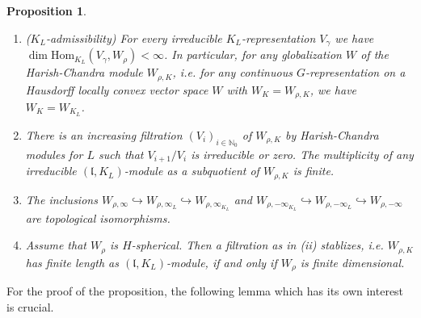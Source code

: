 \documentclass[10]{amsart}
\newtheorem{pro}[thm]{Proposition}
\theoremstyle{remark}
\theoremstyle{definition}
\numberwithin{equation}{section}
\newcommand{\N}{\mathbb{N}}           %
\newcommand{\Hom}{\mathrm{Hom}}
\newcommand{\fl}{{\mathfrak l}}
\begin{document}
{\begin{pro}
\begin{enumerate}
\item[(i)] ($K_L$-admissibility) For every irreducible $K_L$-representation $V_\gamma$ we have $\dim \Hom_{K_L}(V_\gamma,W_\rho)<\infty$. In particular, for any globalization $W$
of  the Harish-Chandra module $W_{\rho,K}$, i.e. for any continuous $G$-representation  on a Hausdorff locally convex vector space $W$ with $W_K=W_{\rho,K}$, we have
$W_{K}=W_{K_L}$.
\item[(ii)] There is an increasing filtration $(V_i)_{i\in\N_0}$  of $W_{\rho,K}$ by Harish-Chandra modules for $L$
such that $V_{i+1}/V_i$ is irreducible or zero. The multiplicity of any irreducible $(\fl,K_L)$-module as a subquotient of $W_{\rho,K}$ is finite.
\item[(iii)] The inclusions $W_{\rho,\infty}\hookrightarrow W_{\rho,\infty_L}\hookrightarrow W_{\rho,\infty_{K_L}}$ and $W_{\rho,-\infty_{K_L}}\hookrightarrow W_{\rho,-\infty_L}\hookrightarrow W_{\rho,-\infty}$ are topological
isomorphisms.
\item[(iv)] Assume that $W_\rho$ is $H$-spherical. Then a filtration as in (ii) stablizes, i.e. $W_{\rho,K}$ has finite length as $(\fl,K_L)$-module, if and only if $W_\rho$ is finite dimensional.
\end{enumerate}
\end{pro}

For the proof of the proposition, the following lemma which has its own interest is crucial. 

}
\end{document}
